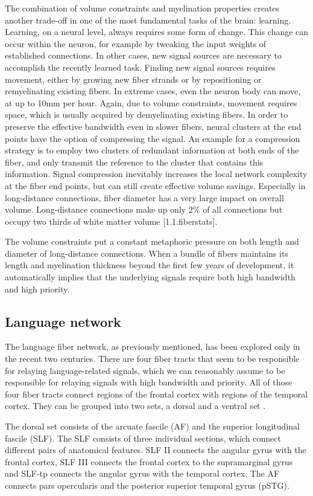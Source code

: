 The combination of volume constraints and myelination properties creates another trade-off in one of the most fundamental tasks of the brain: learning.
Learning, on a neural level, always requires some form of change.
This change can occur within the neuron, for example by tweaking the input weights of established connections.
In other cases, new signal sources are necessary to accomplish the recently learned task.
Finding new signal sources requires movement, either by growing new fiber strands or by repositioning or remyelinating existing fibers.
In extreme cases, even the neuron body can move, at up to 10mm per hour.
Again, due to volume constraints, movement requires space, which is usually acquired by demyelinating existing fibers.
In order to preserve the effective bandwidth even in slower fibers, neural clusters at the end points have the option of compressing the signal.
An example for a compression strategy is to employ two clusters of redundant information at both ends of the fiber, and only transmit the reference to the cluster that contains this information.
Signal compression inevitably increases the local network complexity at the fiber end points, but can still create effective volume savings.
Especially in long-distance connections, fiber diameter has a very large impact on overall volume.
Long-distance connections make up only 2\% of all connections but occupy two thirds of white matter volume [1.1.fiberstats].

The volume constraints put a constant metaphoric pressure on both length and diameter of long-distance connections.
When a bundle of fibers maintains its length and myelination thickness beyond the first few years of development, it automatically implies that the underlying signals require both high bandwidth and high priority.

\subsection{Language network}
The language fiber network, as previously mentioned, has been explored only in the recent two centuries.
There are four fiber tracts that seem to be responsible for relaying language-related signals, which we can reasonably assume to be responsible for relaying signals with high bandwidth and priority.
All of those four fiber tracts connect regions of the frontal cortex with regions of the temporal cortex.
They can be grouped into two sets, a dorsal and a ventral set \cite{1.1.Gierhan}.

The dorsal set consists of the arcuate fascile (AF) and the superior longitudinal fascile (SLF).
The SLF consists of three individual sections, which connect different pairs of anatomical features.
SLF II connects the angular gyrus with the frontal cortex, SLF III connects the frontal cortex to the supramarginal gyrus and SLF-tp connects the angular gyrus with the temporal cortex.
The AF connects pars opercularis and the posterior superior temporal gyrus (pSTG).

